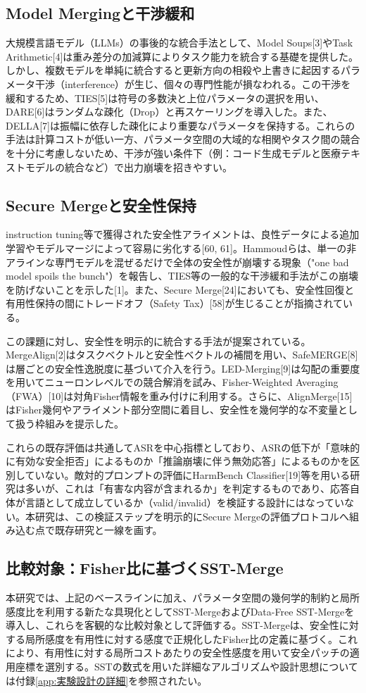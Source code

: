 \documentclass{article}
\begin{document}
\subsection{Model Mergingと干渉緩和}
大規模言語モデル（LLMs）の事後的な統合手法として、Model Soups[3]やTask Arithmetic[4]は重み差分の加減算によりタスク能力を統合する基礎を提供した。しかし、複数モデルを単純に統合すると更新方向の相殺や上書きに起因するパラメータ干渉（interference）が生じ、個々の専門性能が損なわれる。この干渉を緩和するため、TIES[5]は符号の多数決と上位パラメータの選択を用い、DARE[6]はランダムな疎化（Drop）と再スケーリングを導入した。また、DELLA[7]は振幅に依存した疎化により重要なパラメータを保持する。これらの手法は計算コストが低い一方、パラメータ空間の大域的な相関やタスク間の競合を十分に考慮しないため、干渉が強い条件下（例：コード生成モデルと医療テキストモデルの統合など）で出力崩壊を招きやすい。

\subsection{Secure Mergeと安全性保持}
instruction tuning等で獲得された安全性アライメントは、良性データによる追加学習やモデルマージによって容易に劣化する[60, 61]。Hammoudらは、単一の非アラインな専門モデルを混ぜるだけで全体の安全性が崩壊する現象（"one bad model spoils the bunch"）を報告し、TIES等の一般的な干渉緩和手法がこの崩壊を防げないことを示した[1]。また、Secure Merge[24]においても、安全性回復と有用性保持の間にトレードオフ（Safety Tax）[58]が生じることが指摘されている。

この課題に対し、安全性を明示的に統合する手法が提案されている。MergeAlign[2]はタスクベクトルと安全性ベクトルの補間を用い、SafeMERGE[8]は層ごとの安全性逸脱度に基づいて介入を行う。LED-Merging[9]は勾配の重要度を用いてニューロンレベルでの競合解消を試み、Fisher-Weighted Averaging（FWA）[10]は対角Fisher情報を重み付けに利用する。さらに、AlignMerge[15]はFisher幾何やアライメント部分空間に着目し、安全性を幾何学的な不変量として扱う枠組みを提示した。

これらの既存評価は共通してASRを中心指標としており、ASRの低下が「意味的に有効な安全拒否」によるものか「推論崩壊に伴う無効応答」によるものかを区別していない。敵対的プロンプトの評価にHarmBench Classifier[19]等を用いる研究は多いが、これは「有害な内容が含まれるか」を判定するものであり、応答自体が言語として成立しているか（valid/invalid）を検証する設計にはなっていない。本研究は、この検証ステップを明示的にSecure Mergeの評価プロトコルへ組み込む点で既存研究と一線を画す。

\subsection{比較対象：Fisher比に基づくSST-Merge}
本研究では、上記のベースラインに加え、パラメータ空間の幾何学的制約と局所感度比を利用する新たな具現化としてSST-MergeおよびData-Free SST-Mergeを導入し、これらを客観的な比較対象として評価する。SST-Mergeは、安全性に対する局所感度を有用性に対する感度で正規化したFisher比の定義に基づく。これにより、有用性に対する局所コストあたりの安全性感度を用いて安全パッチの適用座標を選別する。SSTの数式を用いた詳細なアルゴリズムや設計思想については付録\ref{app:実験設計の詳細}を参照されたい。
\end{document}
